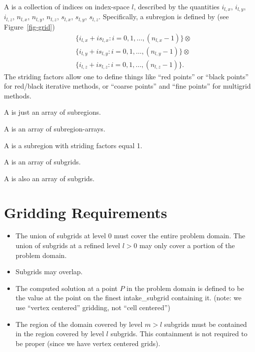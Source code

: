 A  is a collection of indices on index-space
$l$, described by the quantities
$i_{l,x}$, $i_{l,y}$, $i_{l,z}$,
$n_{l,x}$, $n_{l,y}$, $n_{l,z}$,
$s_{l,x}$, $s_{l,y}$, $s_{l,z}$.
Specifically, a subregion is defined by
(see Figure~\ref{fig-grid})
\begin{eqnarray}
& & \{ i_{l,x} + i s_{l,x} : i = 0, 1, \ldots, (n_{l,x}-1) \} \otimes \\
& & \{ i_{l,y} + i s_{l,y} : i = 0, 1, \ldots, (n_{l,y}-1) \} \otimes \\
& & \{ i_{l,z} + i s_{l,z} : i = 0, 1, \ldots, (n_{l,z}-1) \} .
\end{eqnarray}
The striding factors allow one to define things
like ``red points'' or ``black points'' for red/black iterative methods,
or ``coarse points'' and ``fine points'' for multigrid methods.

A  is just an array of subregions.

A  is an array of subregion-arrays.

A  is a subregion with striding factors equal 1.

A  is an array of subgrids.

A  is also an array of subgrids.


\section{Gridding Requirements}
\label{Gridding Requirements}

\begin{itemize}

\item
The union of subgrids at level 0 must cover the entire problem domain.
The union of subgrids at a refined level $l > 0$
may only cover a portion of the problem domain.
 
\item
Subgrids may overlap.
 
\item
The computed solution at a point $P$
in the problem domain
is defined to be the value at the point on the finest intake_subgrid containing it.
(note: we use ``vertex centered'' gridding, not ``cell centered'')

\item
The region of the domain covered by level $m > l$ subgrids
must be contained in the region covered by level $l$ subgrids.
This containment is not required to be proper (since we have vertex
centered grids).
 
\end{itemize}

